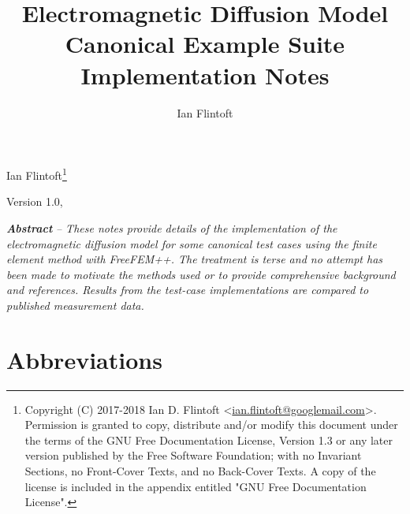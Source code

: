 \documentclass[a4paper]{article}
\title{Electromagnetic Diffusion Model Canonical Example Suite Implementation Notes}
\author{Ian Flintoft}
\newcommand{\mydate}{Version 1.0, \formatdate{24}{2}{2018}}
\numberwithin{equation}{section}
\begin{document}
\clearpage{}
\vspace{5mm}
\thispagestyle{plain}
{\centering\large 
Ian Flintoft\footnote{
Copyright (C) 2017-2018 Ian D. Flintoft <\href{mailto:ian.flintoft@googlemail.com}{ian.flintoft@googlemail.com}>.
Permission is granted to copy, distribute and/or modify this document under the 
terms of the GNU Free Documentation License, Version 1.3 or any later version 
published by the Free Software Foundation; with no Invariant Sections, no Front-Cover Texts, 
and no Back-Cover Texts. A copy of the license is included in the appendix entitled "GNU
Free Documentation License".}
\par}
\vspace{5mm}
{\centering
\mydate
\par}
\vspace{5mm}
\textbf{\textit{Abstract}}\textit{ -- These notes provide details of the implementation of the 
electromagnetic diffusion model for some canonical test cases using the finite element method
with FreeFEM++. The treatment is terse and no attempt has been made to motivate the methods used 
or to provide comprehensive background and references. Results from the test-case implementations
are compared to published measurement data.
}
%
\setcounter{tocdepth}{3}
\renewcommand\contentsname{Contents}
\tableofcontents
%
\newpage

\section*{Abbreviations}
\label{sc:abbrev}
\end{document}

